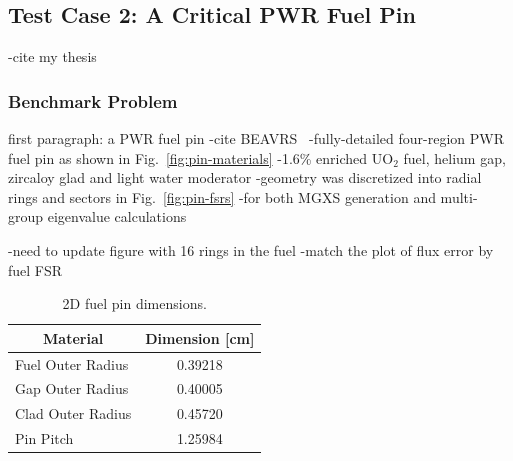 
\subsection{Test Case 2: A Critical PWR Fuel Pin}
\label{subsec:test-case2}

-cite my thesis~\cite{boyd2016thesis}


\subsubsection{Benchmark Problem}
\label{subsubsec:benchmark-case2}

first paragraph: a PWR fuel pin
-cite BEAVRS~\cite{horelik2013beavrs}
-fully-detailed four-region PWR fuel pin as shown in Fig.~\ref{fig:pin-materials}
  -1.6\% enriched UO$_2$ fuel, helium gap, zircaloy glad and light water moderator
-geometry was discretized into radial rings and sectors in Fig.~\ref{fig:pin-fsrs}
  -for both MGXS generation and multi-group eigenvalue calculations

-need to update figure with 16 rings in the fuel
  -match the plot of flux error by fuel FSR

\begin{table}[H]
  \centering
  \caption{2D fuel pin dimensions.}
  \label{table:pin-dimensions} 
  \begin{tabular}{l c}
  \toprule
  \multicolumn{1}{c}{\bf Material} &
  {\bf Dimension [cm]} \\
  \midrule
  Fuel Outer Radius & 0.39218 \\
  Gap Outer Radius &  0.40005 \\
  Clad Outer Radius & 0.45720 \\
  Pin Pitch &         1.25984 \\
  \bottomrule
\end{tabular}
\end{table}

